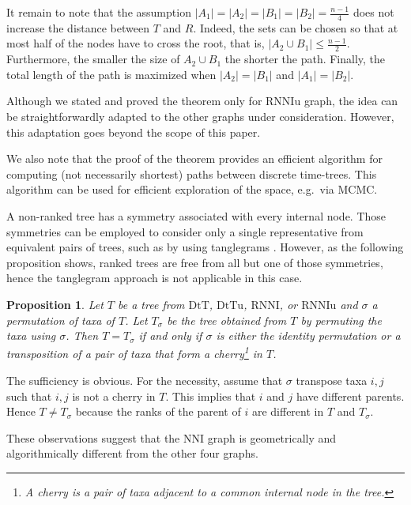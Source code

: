 \documentclass[11pt]{amsart}
\newtheorem{proposition}[lemma]{Proposition}
\theoremstyle{definition}
\newcommand{\nni}{\mathrm{NNI}}
\newcommand{\rnni}{\mathrm{RNNI}}
\newcommand{\rnniu}{\mathrm{RNNIu}}
\newcommand{\dtt}{\mathrm{DtT}}
\newcommand{\dttu}{\mathrm{DtTu}}
\begin{document}
It remain to note that the assumption $|A_1| = |A_2| = |B_1| = |B_2| = \frac{n-1}{4}$ does not increase the distance between $T$ and $R$.
Indeed, the sets can be chosen so that at most half of the nodes have to cross the root, that is, $|A_2 \cup B_1| \le \frac{n-1}{2}$.
Furthermore, the smaller the size of $A_2 \cup B_1$ the shorter the path.
Finally, the total length of the path is maximized when $|A_2| = |B_1|$ and $|A_1| = |B_2|$.
\endproof

Although we stated and proved the theorem only for $\rnniu$ graph, the idea can be straightforwardly adapted to the other graphs under consideration.
However, this adaptation goes beyond the scope of this paper.

We also note that the proof of the theorem provides an efficient algorithm for computing (not necessarily shortest) paths between discrete time-trees.
This algorithm can be used for efficient exploration of the space, e.g.\ via MCMC.

A non-ranked tree has a symmetry associated with every internal node.
Those symmetries can be employed to consider only a single representative from equivalent pairs of trees, such as by using tanglegrams \autocite{Matsen2015-fn, Whidden2015-es}.
However, as the following proposition shows, ranked trees are free from all but one of those symmetries, hence the tanglegram approach is not applicable in this case.

\begin{proposition}
Let $T$ be a tree from $\dtt$, $\dttu$, $\rnni$, or $\rnniu$ and $\sigma$ a permutation of taxa of $T$.
Let $T_\sigma$ be the tree obtained from $T$ by permuting the taxa using $\sigma$.
Then $T = T_\sigma$ if and only if $\sigma$ is either the identity permutation or a transposition of a pair of taxa that form a
cherry\footnote{A \emph{cherry} is a pair of taxa adjacent to a common internal node in the tree.}
in $T$.
\end{proposition}

\proof
The sufficiency is obvious.
For the necessity, assume that $\sigma$ transpose taxa $i,j$ such that $i,j$ is not a cherry in $T$.
This implies that $i$ and $j$ have different parents.
Hence $T \ne T_\sigma$ because the ranks of the parent of $i$ are different in $T$ and $T_\sigma$.
\endproof

These observations suggest that the $\nni$ graph is geometrically and algorithmically different from the other four graphs.
\end{document}
